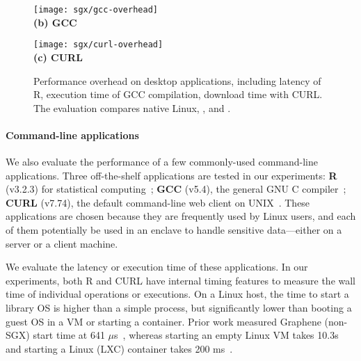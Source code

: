 \begin{figure}[t!]
\centering
\footnotesize
\begin{minipage}{.49\textwidth}
\centering
\texttt{[image: sgx/gcc-overhead]}\\
\vspace{3pt}
{\bf (b) GCC}
\end{minipage}
\begin{minipage}{.49\textwidth}
\centering
\texttt{[image: sgx/curl-overhead]}\\
\vspace{3pt}
{\bf (c) CURL}
\end{minipage}
\caption{Performance overhead on desktop applications, including latency of R, execution time of GCC compilation, download time with CURL. The evaluation compares native Linux, \graphene{}, and \graphenesgx{}.} %
\label{fig:desktop-overhead}
\end{figure}



\paragraph{Command-line applications}


We also evaluate the performance of a few commonly-used command-line applications.
Three off-the-shelf applications are tested in our experiments:
{\bf R} (v3.2.3) for statistical computing~\cite{r-project}; {\bf GCC} (v5.4), the general GNU C compiler~\cite{gcc}; {\bf CURL} (v7.74), the default command-line web client on UNIX~\cite{curl}.
These applications are chosen because they are frequently used by Linux users,
and each of them potentially  be used 
in an enclave to handle sensitive data---either on a server or a client
machine.



We evaluate the latency or execution time of these applications. 
In our experiments, both R and CURL have internal timing features to measure the wall time
of individual operations or executions.
On a Linux host, the time to start a library OS is higher than a simple 
process, but significantly lower than booting a guest OS in a VM or
starting a container. 
Prior work measured Graphene (non-SGX) start time at 641 $\mu$s~\cite{tsai14graphene}, whereas starting an empty Linux VM takes 10.3s and starting a Linux (LXC) container takes 200 ms~\cite{agarwal15container}. 


